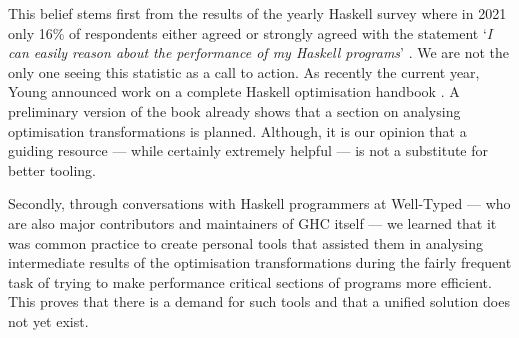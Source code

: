 This belief stems first from the results of the yearly
Haskell survey where in 2021 only 16\% of respondents either agreed or strongly agreed with the
statement `\textit{I can easily reason about the performance of my Haskell programs}' \cite{haskell_survey_2021}.
We are not the only one seeing this statistic as a call to action. As recently the current year,
Young announced work on a complete Haskell optimisation handbook \cite{optimisation_handbook}.
A preliminary version of the book already shows that a section on analysing optimisation transformations
is planned. Although, it is our opinion that a guiding resource --- while certainly extremely helpful ---
is not a substitute for better tooling.

Secondly, through conversations with Haskell programmers at Well-Typed --- who are also major contributors
and maintainers of GHC itself --- we learned that it was common practice to create personal tools that
assisted them in analysing intermediate results of the optimisation transformations during the fairly
frequent task of trying to make performance critical sections of programs more efficient. 
This proves that there is a demand for such tools and that a unified solution does not yet exist.

